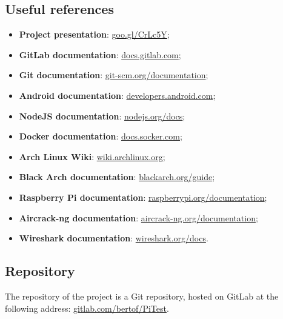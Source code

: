 \documentclass[../PiTest.tex]{subfiles}
\begin{document}
	\subsection{Useful references}
		\begin{itemize}
			\item\textbf{Project presentation}: \url{goo.gl/CrLc5Y};
			\item\textbf{GitLab documentation}: \url{docs.gitlab.com};
			\item\textbf{Git documentation}: \url{git-scm.org/documentation};
			\item\textbf{Android documentation}: \url{developers.android.com};
			\item\textbf{NodeJS documentation}: \url{nodejs.org/docs};
			\item\textbf{Docker documentation}: \url{docs.socker.com};
			\item\textbf{Arch Linux Wiki}: \url{wiki.archlinux.org};
			\item\textbf{Black Arch documentation}: \url{blackarch.org/guide};
			\item\textbf{Raspberry Pi documentation}: \url{raspberrypi.org/documentation};
			\item\textbf{Aircrack-ng documentation}: \url{aircrack-ng.org/documentation};
			\item\textbf{Wireshark documentation}: \url{wireshark.org/docs}.
		\end{itemize}
			
		\subsection{Repository}
		The repository of the project is a Git repository, hosted on GitLab at the following address: \url{gitlab.com/bertof/PiTest}.
\end{document}
